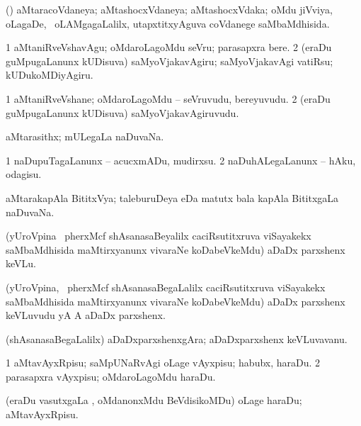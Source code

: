 \bentry
{}
\gl{\gu}
\bmng
(\jiVvi) aMtaracoVdaneya; aMtashocxVdaneya; aMtashocxVdaka; oMdu jiVviya, oLagaDe, \kanmu\ oLAMgagaLalilx, utapxtitxyAguva coVdanege saMbaMdhisida. 
\emng
\eentry

\bentry
{}
\gl{\akirx}
\bmng
\bnum
\num{1} aMtaniRveVshavAgu; oMdaroLagoMdu seVru; parasapxra bere. 
\num{2} (eraDu guMpugaLanunx kUDisuva) saMyoVjakavAgiru; saMyoVjakavAgi vatiRsu; kUDukoMDiyAgiru. 
\enum
\emng
\eentry

\bentry
{}
\gl{\nA}
\bmng
\bnum
\num{1} aMtaniRveVshane; oMdaroLagoMdu -- seVruvudu, bereyuvudu. 
\num{2} (eraDu guMpugaLanunx kUDisuva) saMyoVjakavAgiruvudu. 
\enum
\emng
\eentry

\bentry
{}
\gl{\gu}
\bmng
aMtarasithx; mULegaLa naDuvaNa. 
\emng
\eentry

\bentry
{}
\gl{\sakirx}
\bmng
\bnum
\num{1} naDupuTagaLanunx -- acucxmADu, mudirxsu. 
\num{2} naDuhALegaLanunx -- hAku, odagisu. 
\enum
\emng
\eentry

\bentry
{}
\gl{\gu}
\bmng
aMtarakapAla BititxVya; taleburuDeya eDa matutx bala kapAla BititxgaLa naDuvaNa. 
\emng
\eentry

\bentry
{}
\gl{\sakirx}
\bmng
(yUroVpina \kanmu\ pherxMcf shAsanasaBeyalilx caciRsutitxruva viSayakekx saMbaMdhisida maMtirxyanunx vivaraNe koDabeVkeMdu) aDaDx parxshenx keVLu. 
\emng
\eentry

\bentry
{}
\gl{\nA}
\bmng
(yUroVpina, \kanmu\ pherxMcf shAsanasaBegaLalilx caciRsutitxruva viSayakekx saMbaMdhisida maMtirxyanunx vivaraNe koDabeVkeMdu) aDaDx parxshenx keVLuvudu yA A aDaDx parxshenx. 
\emng
\eentry

\bentry
{}
\gl{\nA}
\bmng
(shAsanasaBegaLalilx) aDaDxparxshenxgAra; aDaDxparxshenx keVLuvavanu. 
\emng
\eentry

\bentry
{}
\gl{\sakirx}
\bmng
\bnum
\num{1} aMtavAyxRpisu; saMpUNaRvAgi oLage vAyxpisu; habubx, haraDu. 
\num{2} parasapxra vAyxpisu; oMdaroLagoMdu haraDu. 
\enum
\emng

\noindent 
\gl{\akirx}
\bmng
(eraDu vasutxgaLa \vi, oMdanonxMdu BeVdisikoMDu) oLage haraDu; aMtavAyxRpisu. 
\emng
\eentry

